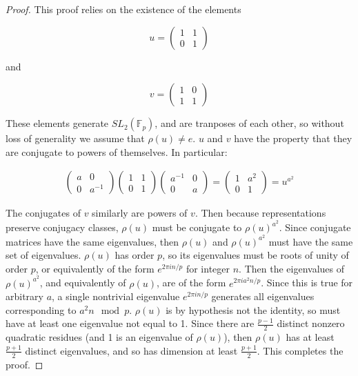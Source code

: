 \documentclass[12pt]{amsart}
\begin{document}
\begin{proof}
This proof relies on the existence of the elements 

\[ u = \begin{pmatrix} 1 & 1\\
0 & 1 \end{pmatrix}\] 

and 

\[ v = \begin{pmatrix} 1 & 0\\
1 & 1 \end{pmatrix}\] 

These elements generate $SL_2(\mathbb{F}_p)$, and are tranposes of each other, so without loss of generality we assume that $\rho(u) \neq e$. $u$ and $v$ have the property that they are conjugate to powers of themselves. In particular: 

\begin{align*}
    \begin{pmatrix} a & 0\\
    0  & a^{-1}  \end{pmatrix} 
    \begin{pmatrix}
        1 & 1\\
        0 & 1
    \end{pmatrix}
    \begin{pmatrix} a^{-1} & 0\\
    0 & a \end{pmatrix} = \begin{pmatrix} 1 & a^2 \\
    0 & 1 \end{pmatrix} = u^{a^2}
\end{align*}

The conjugates of $v$ similarly are powers of $v$. Then because representations preserve conjugacy classes, $\rho(u)$ must be conjugate to $\rho(u)^{a^2}$. Since conjugate matrices have the same eigenvalues, then $\rho(u)$ and $\rho(u)^{a^2}$ must have the same set of eigenvalues. $\rho(u)$ has order $p$, so its eigenvalues must be roots of unity of order $p$, or equivalently of the form $e^{2\pi i n/p}$ for integer $n$. Then the eigenvalues of $\rho(u)^{a^2}$, and equivalently of $\rho(u)$, are of the form $e^{2\pi i a^2 n/p}$. Since this is true for arbitrary $a$, a single nontrivial eigenvalue $e^{2\pi i n/p}$ generates all eigenvalues corresponding to $a^2 n \mod p$. $\rho(u)$ is by hypothesis not the identity, so must have at least one eigenvalue not equal to 1. Since there are $\frac{p-1}{2} $ distinct nonzero quadratic residues (and 1 is an eigenvalue of $\rho(u)$), then $\rho(u)$ has at least $\frac{p+1}{2} $ distinct eigenvalues, and so has dimension at least $\frac{p+1}{2} $. This completes the proof. 
\end{proof}
\end{document}
